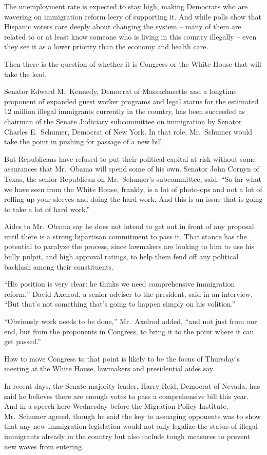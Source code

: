 ﻿\documentclass[12pt]{article}
\begin{document}
The unemployment rate is expected to stay high, making Democrats who are wavering on immigration
reform leery of supporting it. And while polls show that Hispanic voters care deeply about changing
the system -- many of them are related to or at least know someone who is living in this country
illegally -- even they see it as a lower priority than the economy and health care.

Then there is the question of whether it is Congress or the White House that will take the lead.

Senator Edward M.~Kennedy, Democrat of Massachusetts and a longtime proponent of expanded guest
worker programs and legal status for the estimated 12 million illegal immigrants currently in the
country, has been succeeded as chairman of the Senate Judiciary subcommittee on immigration by
Senator Charles E.~Schumer, Democrat of New York. In that role, Mr.~Schumer would take the point in
pushing for passage of a new bill.

But Republicans have refused to put their political capital at risk without some assurances that
Mr.~Obama will spend some of his own. Senator John Cornyn of Texas, the senior Republican on
Mr.~Schumer's subcommittee, said: ``So far what we have seen from the White House, frankly, is a lot
of photo-ops and not a lot of rolling up your sleeves and doing the hard work. And this is an issue
that is going to take a lot of hard work.''

Aides to Mr.~Obama say he does not intend to get out in front of any proposal until there is a
strong bipartisan commitment to pass it. That stance has the potential to paralyze the process,
since lawmakers are looking to him to use his bully pulpit, and high approval ratings, to help them
fend off any political backlash among their constituents.

``His position is very clear: he thinks we need comprehensive immigration reform,'' David Axelrod, a
senior adviser to the president, said in an interview. ``But that's not something that's going to
happen simply on his volition.''

``Obviously work needs to be done,'' Mr.~Axelrod added, ``and not just from our end, but from the
proponents in Congress, to bring it to the point where it can get passed.''

How to move Congress to that point is likely to be the focus of Thursday's meeting at the White
House, lawmakers and presidential aides say.

In recent days, the Senate majority leader, Harry Reid, Democrat of Nevada, has said he believes
there are enough votes to pass a comprehensive bill this year. And in a speech here Wednesday before
the Migration Policy Institute, Mr.~Schumer agreed, though he said the key to assuaging opponents
was to show that any new immigration legislation would not only legalize the status of illegal
immigrants already in the country but also include tough measures to prevent new waves from
entering.
\end{document}
